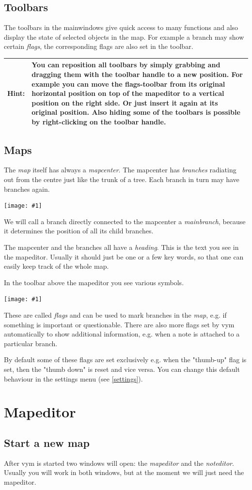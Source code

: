 \documentclass[12pt,a4paper]{article}
\newcommand{\maximage}[1]{  
    \begin{center}
        \texttt{[image: \#1]} 
    \end{center}
}
\newcommand{\hint}[1]{
    \begin{center} 
        \begin{tabular}{|rp{12cm}|} \hline
            {\bf Hint}:& #1\\   \hline
        \end{tabular}
            \marginpar{\Huge !} 
    \end{center} 
}
\newcommand{\vym}{{\sc vym }}
\begin{document}
\subsection{Toolbars}
The toolbars in the mainwindows give quick access to many functions and
also display the state of selected objects in the map. For example a
branch may show certain {\em flags}, the corresponding flags are also
set in the toolbar. 

\hint {You can reposition all toolbars by simply grabbing and
dragging them with the toolbar handle to a new position. For example you
can move the flags-toolbar from its original horizontal position on top
of the mapeditor to a vertical position on the right side.  Or just
insert it again at its original position. Also hiding some of the
toolbars is possible by right-clicking on the toolbar handle.}

\subsection{Maps}
The  {\em map} itself has always a {\em mapcenter}.  The
mapcenter has {\em branches} radiating out from the centre just like the trunk 
of a tree. Each branch in turn may have branches again.
    \maximage{images/branches.png}
We will call a branch directly connected to the mapcenter a {\em
mainbranch}, because it determines the position of all its child
branches.

The mapcenter and the branches all have a {\em heading}. This is the
text you see in the mapeditor. Usually it should just be one or a few
key words, so that one can easily keep track of the whole map.


In the toolbar above the mapeditor you see various symbols.
    \maximage{images/default-flags.png}
These are called {\em flags} and can be used to mark branches in the
{\em map}, e.g. if something is important or questionable. 
There are also more flags set by \vym automatically to show additional
information, e.g. when a note is attached to a  particular branch.

By default some of these flags are set exclusively e.g. when the 
"thumb-up" flag is set, then the "thumb down" is reset and vice
versa. You can change this default behaviour in the settings menu (see
\ref{settings}).

\section{Mapeditor} \label {mapeditor}
\subsection{Start a new map}
After \vym is started two windows will open: the {\em mapeditor} and the {\em noteditor}. Usually you will work in both windows, but at the moment we
will just need the mapeditor. 
\end{document}
